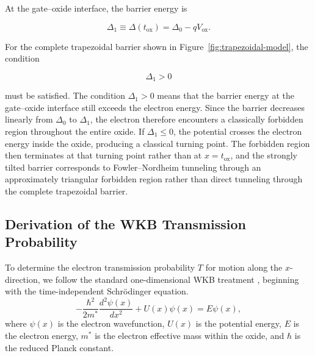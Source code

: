 \documentclass[12pt]{article}
\begin{document}
At the gate--oxide interface, the barrier energy is

\begin{equation}
    \Delta_1\equiv\Delta(t_{\mathrm{ox}})
    =\Delta_0-qV_{\mathrm{ox}}.
    \label{eq:gate-oxide-barrier}
\end{equation}

For the complete trapezoidal barrier shown in Figure~\ref{fig:trapezoidal-model}, the condition

\begin{equation}
    \Delta_1>0
    \label{eq:trapezoidal-condition}
\end{equation}

must be satisfied. The condition \(\Delta_1>0\) means that the barrier energy at the gate--oxide interface still exceeds the electron energy. Since the barrier decreases linearly from \(\Delta_0\) to \(\Delta_1\), the electron therefore encounters a classically forbidden region throughout the entire oxide. If \(\Delta_1\leq0\), the potential crosses the electron energy inside the oxide, producing a classical turning point. The forbidden region then terminates at that turning point rather than at \(x=t_{\mathrm{ox}}\), and the strongly tilted barrier corresponds to Fowler--Nordheim tunneling through an approximately triangular forbidden region rather than direct tunneling through the complete trapezoidal barrier.

\subsection{Derivation of the WKB Transmission Probability}
To determine the electron transmission probability \(T\) for motion along the \(x\)-direction, we follow the standard one-dimensional WKB treatment \cite[Sec.~9.2]{griffiths2018}\cite{townsend2010}, beginning with the time-independent Schr\"odinger equation.
\begin{equation}
    -\frac{\hbar^2}{2m^*}\frac{d^2\psi(x)}{dx^2}
    +U(x)\psi(x)=E\psi(x),
    \label{eq:tise}
\end{equation}
where \(\psi(x)\) is the electron wavefunction, \(U(x)\) is the potential energy, \(E\) is the electron energy, \(m^*\) is the electron effective mass within the oxide, and \(\hbar\) is the reduced Planck constant.
\end{document}
